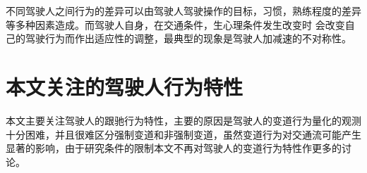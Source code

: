 不同驾驶人之间行为的差异可以由驾驶人驾驶操作的目标，习惯，熟练程度的差异等多种因素造成。而驾驶人自身，在交通条件，生心理条件发生改变时 会改变自己的驾驶行为而作出适应性的调整，最典型的现象是驾驶人加减速的不对称性。
%
%
%
%
%
%

\section{本文关注的驾驶人行为特性}

本文主要关注驾驶人的跟驰行为特性，主要的原因是驾驶人的变道行为量化的观测十分困难，并且很难区分强制变道和非强制变道，虽然变道行为对交通流可能产生显著的影响，由于研究条件的限制本文不再对驾驶人的变道行为特性作更多的讨论。

